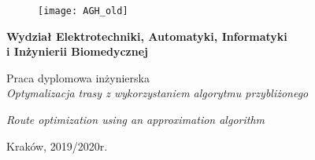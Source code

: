 \documentclass[a4paper, twoside, 12pt, justified]{article}
\begin{document}
	

	\begin{figure}[t]
		\texttt{[image: AGH\_old]}
		\centering
	\end{figure}
	
	\vspace{-5mm}
	\begin{center}
		\textbf{\fontsize{16}{10}\selectfont Wydział Elektrotechniki, Automatyki, Informatyki \\i Inżynierii Biomedycznej}
		\vspace{10mm} %
	
		{\fontsize{18}{10}\selectfont Praca dyplomowa inżynierska} \\ 
		\vspace{10mm}
		{\fontsize{16}{10}\selectfont \textit{Optymalizacja trasy z wykorzystaniem algorytmu przybliżonego}}
		
		{\fontsize{16}{10}\selectfont \textit{Route optimization using an approximation algorithm}}
	\end{center}
	
	\vspace{45mm}
	\begin{flushleft}
		\selectfont {Autor: Rafał Siniewicz \newline
		Kierunek studiów: Automatyka i automatyka \newline 
		Opiekun: dr hab. inż. Joanna Kwiecień \newline}
	
	\end{flushleft}
	
	\begin{center}Kraków, 2019/2020r.\end{center}
	
	\newpage
	
\end{document}

